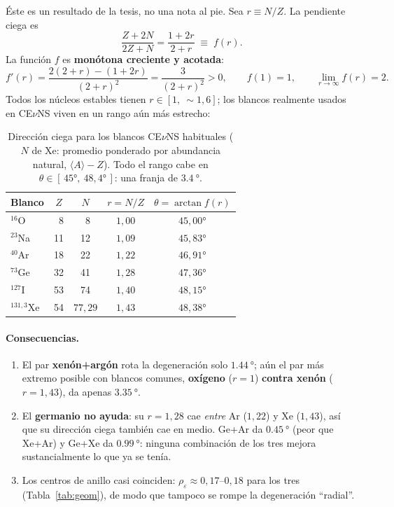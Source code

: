 \documentclass[11pt,a4paper]{article}
\newcommand{\eps}{\varepsilon}
\begin{document}
\'Este es un resultado de la tesis, no una nota al pie. Sea $r\equiv N/Z$. La
pendiente ciega es
\begin{equation}
  \label{eq:ab_ratio}
  \frac{Z+2N}{2Z+N} = \frac{1 + 2r}{2 + r} \;\equiv\; f(r).
\end{equation}
La funci\'on $f$ es \textbf{mon\'otona creciente y acotada}:
\begin{equation}
  \label{eq:fprime}
  f'(r) = \frac{2(2+r) - (1+2r)}{(2+r)^{2}} = \frac{3}{(2+r)^{2}} > 0,
  \qquad
  f(1) = 1,
  \qquad
  \lim_{r\to\infty} f(r) = 2.
\end{equation}
Todos los n\'ucleos estables tienen $r\in[1,\ \sim\!1{,}6]$; los blancos
realmente usados en CE$\nu$NS viven en un rango a\'un m\'as estrecho:

\begin{table}[h]
\centering
\begin{tabular}{@{}lcccc@{}}
\toprule
Blanco & $Z$ & $N$ & $r=N/Z$ & $\theta = \arctan f(r)$ \\
\midrule
$^{16}$O   & \ 8 & \ 8 & $1{,}00$ & $45{,}00\si{\degree}$ \\
$^{23}$Na  & 11  & 12  & $1{,}09$ & $45{,}83\si{\degree}$ \\
$^{40}$Ar  & 18  & 22  & $1{,}22$ & $46{,}91\si{\degree}$ \\
$^{73}$Ge  & 32  & 41  & $1{,}28$ & $47{,}36\si{\degree}$ \\
$^{127}$I  & 53  & 74  & $1{,}40$ & $48{,}15\si{\degree}$ \\
$^{131{,}3}$Xe & 54  & $77{,}29$  & $1{,}43$ & $48{,}38\si{\degree}$ \\
\bottomrule
\end{tabular}
\caption{Direcci\'on ciega para los blancos CE$\nu$NS habituales ($N$ de Xe:
promedio ponderado por abundancia natural, $\langle A\rangle-Z$). Todo el
rango cabe en $\theta\in[\,45\si{\degree},\ 48{,}4\si{\degree}\,]$: una franja
de $\SI{3.4}{\degree}$.}
\label{tab:estructural}
\end{table}

\paragraph{Consecuencias.}
\begin{enumerate}\itemsep2pt
  \item El par \textbf{xen\'on+arg\'on} rota la degeneraci\'on solo
    $\SI{1.44}{\degree}$; a\'un el par m\'as extremo posible con blancos
    comunes, \textbf{ox\'igeno} ($r=1$) \textbf{contra xen\'on} ($r=1{,}43$), da
    apenas $\SI{3.35}{\degree}$.
  \item El \textbf{germanio no ayuda}: su $r=1{,}28$ cae \emph{entre} Ar
    ($1{,}22$) y Xe ($1{,}43$), as\'i que su direcci\'on ciega tambi\'en cae en
    medio. Ge+Ar da $\SI{0.45}{\degree}$ (peor que Xe+Ar) y Ge+Xe da
    $\SI{0.99}{\degree}$: ninguna combinaci\'on de los tres mejora
    sustancialmente lo que ya se ten\'ia.
  \item Los centros de anillo casi coinciden: $\rho_{\eps}\approx 0{,}17$--$0{,}18$
    para los tres (Tabla~\ref{tab:geom}), de modo que tampoco se rompe la
    degeneraci\'on ``radial''.
\end{enumerate}
\end{document}
